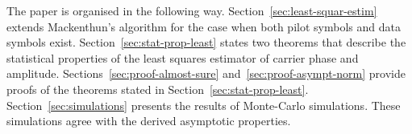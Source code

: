 \documentclass[journal]{IEEEtran}
\begin{document}

The paper is organised in the following way.  Section~\ref{sec:least-squar-estim} extends Mackenthun's algorithm for the case when both pilot symbols and data symbols exist.  %
Section~\ref{sec:stat-prop-least} states two theorems that describe the statistical properties of the least squares estimator of carrier phase and amplitude.  %
Sections~\ref{sec:proof-almost-sure} and~\ref{sec:proof-asympt-norm} provide proofs of the theorems stated in Section~\ref{sec:stat-prop-least}.  %
Section~\ref{sec:simulations} presents the results of Monte-Carlo simulations.  These simulations agree with the derived asymptotic properties.  

\end{document}
